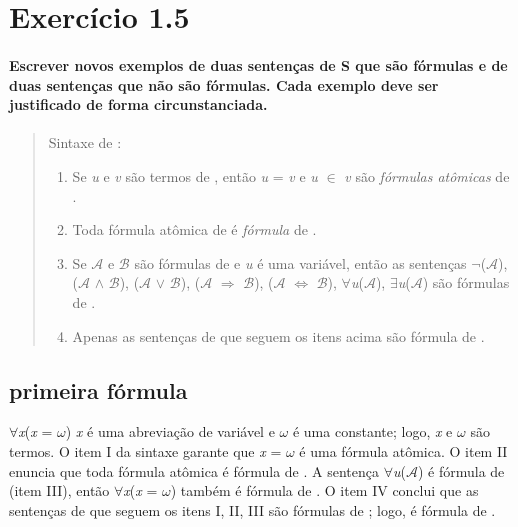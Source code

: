 \section{Exercício 1.5}
\paragraph{Escrever novos exemplos de duas sentenças de S que são fórmulas e de duas sentenças que não são fórmulas. Cada exemplo deve ser justificado de forma circunstanciada.}

\begin{quote}
	Sintaxe de 	:
	\begin{enumerate}[label=\roman*., itemsep=0pt, topsep=0pt]
		\item Se \textit{u} e \textit{v} são termos de	, então \textit{u} = \textit{v} e \textit{u} $\in$ \textit{v} são \textit{fórmulas atômicas} de .
		\item Toda fórmula atômica de  é \textit{fórmula} de .
		\item Se $\mathcal{A}$ e $\mathcal{B}$ são fórmulas de  e \textit{u} é uma variável, então as sentenças $\neg$($\mathcal{A}$), ($\mathcal{A}$ $\land$ $\mathcal{B}$), ($\mathcal{A}$ $\lor$ $\mathcal{B}$), ($\mathcal{A}$ $\Rightarrow$ $\mathcal{B}$), ($\mathcal{A}$ $\Leftrightarrow$ $\mathcal{B}$), $\forall$\textit{u}($\mathcal{A}$), $\exists$\textit{u}($\mathcal{A}$) são fórmulas de .
		\item Apenas as sentenças de  que seguem os itens acima são fórmula de .
	\end{enumerate}
\end{quote}

\subsection{primeira fórmula}
{$\forall$\textit{x}(\textit{x} = $\omega$)}
\newline
\textit{x} é uma abreviação de variável e $\omega$ é uma constante; logo, \textit{x} e $\omega$ são termos. O item I da sintaxe  garante que \textit{x} = $\omega$ é uma fórmula atômica. O item II enuncia que toda fórmula atômica é fórmula de . A sentença $\forall$\textit{u}($\mathcal{A}$) é fórmula de (item III), então {$\forall$\textit{x}(\textit{x} = $\omega$)} também é fórmula de . O item IV conclui que as sentenças de  que seguem os itens I, II, III são fórmulas de ; logo,  é fórmula de .

